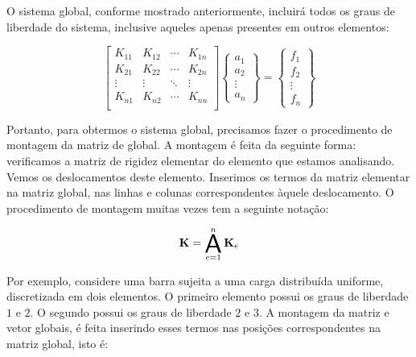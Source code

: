         O sistema global, conforme mostrado anteriormente, incluirá todos os graus de liberdade do sistema, inclusive aqueles apenas presentes em outros elementos:

        \begin{equation}
            \begin{bmatrix}
                K_{11} & K_{12} & \cdots & K_{1n}\\
                K_{21} & K_{22} & \cdots & K_{2n}\\
                \vdots & \vdots & \ddots & \vdots\\
                K_{n1} & K_{n2} & \cdots & K_{nn}\\
            \end{bmatrix}
            \begin{Bmatrix}
                a_1\\
                a_2\\
                \vdots\\
                a_n
            \end{Bmatrix}
            =
            \begin{Bmatrix}
                f_1\\
                f_2\\
                \vdots\\
                f_n
            \end{Bmatrix}
        \end{equation}

        Portanto, para obtermos o sistema global, precisamos fazer o procedimento de montagem da matriz de global. A montagem é feita da seguinte forma: verificamos a matriz de rigidez elementar do elemento que estamos analisando. Vemos os deslocamentos deste elemento. Inserimos os termos da matriz elementar na matriz global, nas linhas e colunas correspondentes àquele deslocamento. O procedimento de montagem muitas vezes tem a seguinte notação:

        \begin{equation}
            \mathbf{K} = \assembly_{e=1}^n \mathbf{K}_e
        \end{equation}
 

        Por exemplo, considere uma barra sujeita a uma carga distribuída uniforme, discretizada em dois elementos. O primeiro elemento possui os graus de liberdade $1$ e $2$. O segundo possui os graus de liberdade $2$ e $3$. A montagem da matriz e vetor globais, é feita inserindo esses termos nas posições correspondentes na matriz global, isto é:

